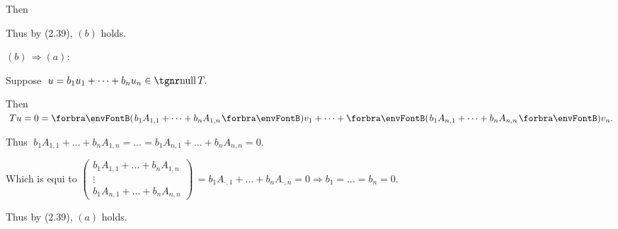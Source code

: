 \documentclass[a4paper, 11pt, UTF8]{article}
\begin{document}
\begin{large}
Then \vspace{-7.2pt}\par\quad\Ha
Thus by (2.39), $(b)$ holds.\vspace{10pt}\par\quad
$(b)\,\Rightarrow(a):\;$\par\quad\Hb
Suppose $\;u=b_1u_1+\dots+b_nu_n\in\null T.$\par\quad\Hb
Then $\;Tu=0=\Par{b_1A_{1,1}+\dots+b_nA_{1,n}}v_1+\dots+\Par{b_1A_{n,1}+\dots+b_nA_{n,n}}v_n.$\par\quad\Hb
Thus $\;b_1A_{1,1}+\dots+b_nA_{1,n}=\dots=b_1A_{n,1}+\dots+b_nA_{n,n}=0.$\vspace{6pt}\par\quad\Hb
Which is equi to {\;\normalsize$
	\begin{pmatrix}
		b_1 A_{1,1}+\dots+b_nA_{1,n}\\
		\vdots\\
		b_1 A_{n,1}+\dots+b_nA_{n,n}
	\end{pmatrix}$}$\,=b_1A_{\cdot,1}+\dots+b_nA_{\cdot,n}=0\Rightarrow b_1=\dots=b_n=0.$\vspace{6pt}\par\quad\Hb
Thus by (2.39), $(a)$ holds.\PfEnd
\SepLine
\pagebreak


\end{large}
\end{document}
